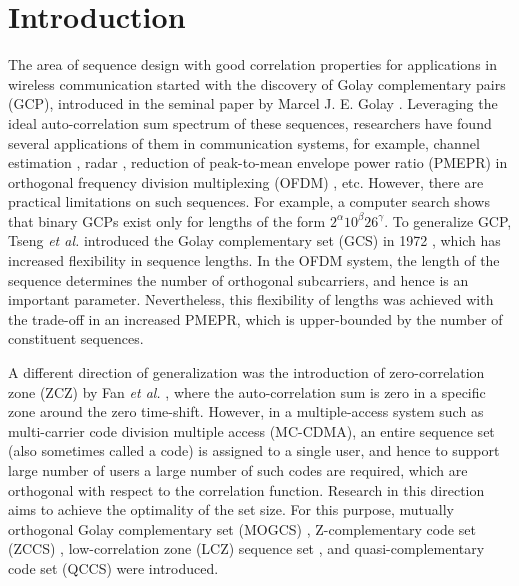 \documentclass[pdflatex,sn-mathphys-num]{sn-jnl}%
\theoremstyle{thmstyleone}
\begin{document}
	
	\maketitle
	
	\section{Introduction}\label{sec1}
	The area of sequence design with good correlation properties for applications in wireless communication started with the discovery of Golay complementary pairs (GCP), introduced in the seminal paper by Marcel J. E. Golay \cite{GolayInfra}. Leveraging the ideal auto-correlation sum spectrum of these sequences, researchers have found several applications of them in communication systems, for example, channel estimation \cite{ChannelEstm}, radar \cite{DopplerRadar}, reduction of peak-to-mean envelope power ratio (PMEPR) in orthogonal frequency division multiplexing (OFDM) \cite{Popo,DavisJedwab}, etc. However, there are practical limitations on such sequences. For example, a computer search shows that binary GCPs exist only for lengths of the form $2^\alpha 10^\beta 26^\gamma$. To generalize GCP, Tseng \textit{et al.} introduced the Golay complementary set (GCS) in 1972 \cite{TsengCS}, which has increased flexibility in sequence lengths. In the OFDM system, the length of the sequence determines the number of orthogonal subcarriers, and hence is an important parameter. Nevertheless, this flexibility of lengths was achieved with the trade-off in an increased PMEPR, which is upper-bounded by the number of constituent sequences. 
	
	A different direction of generalization was the introduction of zero-correlation zone (ZCZ) by Fan \textit{et al.} \cite{FanZCP}, where the auto-correlation sum is zero in a specific zone around the zero time-shift. However, in a multiple-access system such as multi-carrier code division multiple access (MC-CDMA), an entire sequence set (also sometimes called a code) is assigned to a single user, and hence to support large number of users a large number of such codes are required, which are orthogonal with respect to the correlation function. Research in this direction aims to achieve the optimality of the set size. For this purpose, mutually orthogonal Golay complementary set (MOGCS) \cite{hatoriCCC}, Z-complementary code set (ZCCS) \cite{FanZCP}, low-correlation zone (LCZ) sequence set \cite{LiuLCZ}, and quasi-complementary code set (QCCS)\cite{LiuQCSS} were introduced.
	
\end{document}
